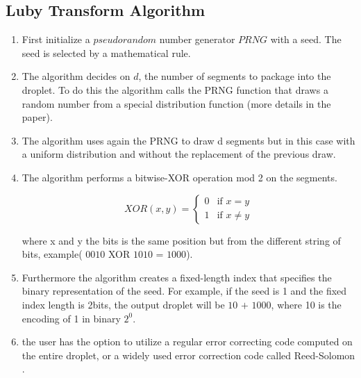 \documentclass[10pt,twocolumn,twoside]{gsajnl}
\begin{document}
\subsection{Luby Transform Algorithm}
\begin{enumerate}

\item First initialize a $pseudorandom$ number generator $PRNG$ with a seed. The seed is selected by a mathematical rule.
\item The algorithm decides on $d$, the number of segments to package into the droplet. To do this the algorithm calls the PRNG function that draws a random number from a special distribution function (more details in the paper).

\item The algorithm uses again the PRNG to draw d segments but in this case with a uniform distribution and without the replacement of the previous draw.

\item The algorithm performs a bitwise-XOR operation mod 2 on the segments.
\begin{center}
\[ XOR(x,y) =
  \begin{cases}
     0 & \text{if } x = y\\
     1 & \text{if } x \ne y
  \end{cases}
\]
\end{center}
where x and y the bits is the same position but from the different string of bits, example( $0010$ XOR $1010$ = $1000$).

\item Furthermore the algorithm creates a fixed-length index that specifies the binary representation of the seed. For example, if the seed is 1 and the fixed index length is 2bits, the output droplet will be $10$ $+$ $1000$, where 10 is the encoding of 1 in binary $2^{0}$.

\item the user has the option to utilize a regular error correcting code computed on the entire droplet, or a widely used error correction code called Reed-Solomon \cite{erlich2017dna}.
\end{enumerate}


\end{document}
